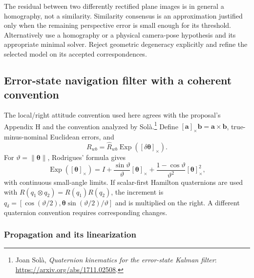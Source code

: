 The residual between two differently rectified plane images is in
general a homography, not a similarity. Similarity consensus is an
approximation justified only when the remaining perspective error is
small enough for its threshold. Alternatively use a homography or a
physical camera-pose hypothesis and its appropriate minimal solver.
Reject geometric degeneracy explicitly and refine the selected model
on its accepted correspondences.

\subsection{Error-state navigation filter with a coherent convention}

The local/right attitude convention used here agrees with the proposal's
Appendix H and the convention analyzed by Sol\`a.\footnote{Joan Sol\`a,
\emph{Quaternion kinematics for the error-state Kalman filter}:
\url{https://arxiv.org/abs/1711.02508}.}
Define $[\boldsymbol a]_\times\boldsymbol b=\boldsymbol a\times
\boldsymbol b$, true-minus-nominal Euclidean errors, and
\begin{equation}
 R_{wb}=\widehat R_{wb}\operatorname{Exp}
                      ([\delta\boldsymbol\theta]_\times).
 \label{eq:right-attitude-error}
\end{equation}
For $\vartheta=\|\boldsymbol\theta\|$, Rodrigues' formula gives
\begin{equation}
 \operatorname{Exp}([\boldsymbol\theta]_\times)
 =I+\frac{\sin\vartheta}{\vartheta}[\boldsymbol\theta]_\times
  +\frac{1-\cos\vartheta}{\vartheta^2}[\boldsymbol\theta]_\times^2,
\end{equation}
with continuous small-angle limits. If scalar-first Hamilton quaternions
are used with $R(q_1\otimes q_2)=R(q_1)R(q_2)$, the increment is
$q_\delta=[\cos(\vartheta/2),
\boldsymbol\theta\sin(\vartheta/2)/\vartheta]$ and is multiplied on the
right. A different quaternion convention requires corresponding changes.

\subsubsection{Propagation and its linearization}

